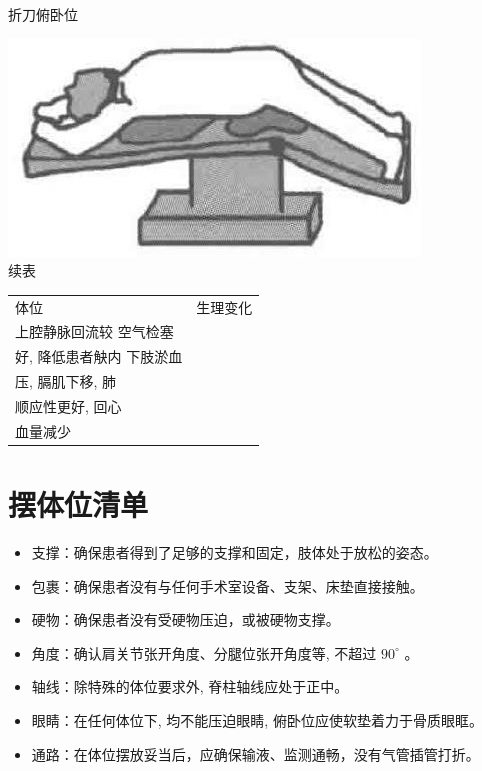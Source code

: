 \documentclass[10pt]{article}
\begin{document}
折刀俯卧位

\includegraphics[max width=\textwidth, center]{2024_07_05_645bb794a4d4f32ee0c8g-112}\\
续表

\begin{center}
\begin{tabular}{ll}
\hline
体位 & 生理变化 \\
上腔静脉回流较 空气检塞 &  \\
好, 降低患者觖内 下肢淤血 &  \\
压, 膈肌下移, 肺 &  \\
顺应性更好, 回心 &  \\
血量减少 &  \\
\end{tabular}
\end{center}

\section*{摆体位清单}
\begin{itemize}
  \item 支撑：确保患者得到了足够的支撑和固定，肢体处于放松的姿态。
  \item 包裹：确保患者没有与任何手术室设备、支架、床垫直接接触。
  \item 硬物：确保患者没有受硬物压迫，或被硬物支撑。
  \item 角度：确认肩关节张开角度、分腿位张开角度等, 不超过 $90^{\circ}$ 。
  \item 轴线：除特殊的体位要求外, 脊柱轴线应处于正中。
  \item 眼睛：在任何体位下, 均不能压迫眼睛, 俯卧位应使软垫着力于骨质眼眶。
  \item 通路：在体位摆放妥当后，应确保输液、监测通畅，没有气管插管打折。
\end{itemize}
\end{document}
